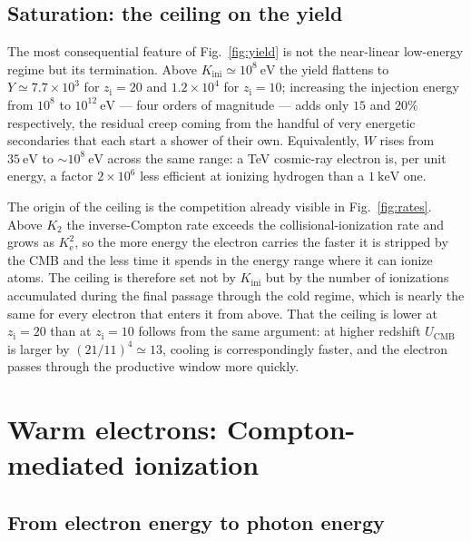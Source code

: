 \documentclass[twocolumn]{article}
\newcommand{\Ke}{K_{\mathrm{e}}}
\newcommand{\Kini}{K_{\mathrm{ini}}}
\newcommand{\zi}{z_{\mathrm{i}}}
\begin{document}
\subsection{Saturation: the ceiling on the yield}

The most consequential feature of Fig.~\ref{fig:yield} is not the near-linear
low-energy regime but its termination. Above
$\Kini \simeq 10^{8}\ \mathrm{eV}$ the yield flattens to
$Y \simeq 7.7\times10^{3}$ for $\zi = 20$ and $1.2\times10^{4}$ for
$\zi = 10$; increasing the injection energy from $10^{8}$ to
$10^{12}\ \mathrm{eV}$ --- four orders of magnitude --- adds only $15$ and
$20\%$ respectively, the residual creep coming from the handful of very
energetic secondaries that each start a shower of their own. Equivalently,
$W$ rises from $35\ \mathrm{eV}$ to $\sim\!10^{8}\ \mathrm{eV}$ across the
same range: a TeV cosmic-ray electron is, per unit energy, a factor
$2\times10^{6}$ less efficient at ionizing hydrogen than a $1\ \mathrm{keV}$
one.

The origin of the ceiling is the competition already visible in
Fig.~\ref{fig:rates}. Above $K_2$ the inverse-Compton rate exceeds the
collisional-ionization rate and grows as $\Ke^{2}$, so the more energy the
electron carries the faster it is stripped by the CMB and the less time it
spends in the energy range where it can ionize atoms. The ceiling is
therefore set not by $\Kini$ but by the number of ionizations accumulated
during the final passage through the cold regime, which is nearly the same for
every electron that enters it from above. That the ceiling is lower at
$\zi = 20$ than at $\zi = 10$ follows from the same argument: at higher
redshift $U_{\mathrm{CMB}}$ is larger by $(21/11)^{4} \simeq 13$, cooling is
correspondingly faster, and the electron passes through the productive window
more quickly.

\section{Warm electrons: Compton-mediated ionization}
\label{sec:warm}

\subsection{From electron energy to photon energy}
\end{document}
